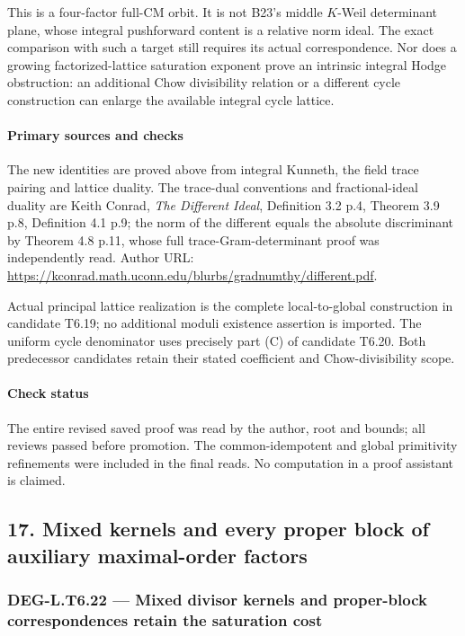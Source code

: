 This is a four-factor full-CM orbit. It is not B23's middle \(K\)-Weil determinant plane, whose integral pushforward content is a relative norm ideal. The exact comparison with such a target still requires its actual correspondence. Nor does a growing factorized-lattice saturation exponent prove an intrinsic integral Hodge obstruction: an additional Chow divisibility relation or a different cycle construction can enlarge the available integral cycle lattice.

\paragraph{Primary sources and checks}\label{primary-sources-and-checks}

The new identities are proved above from integral Kunneth, the field trace pairing and lattice duality. The trace-dual conventions and fractional-ideal duality are Keith Conrad, \emph{The Different Ideal}, Definition 3.2 p.4, Theorem 3.9 p.8, Definition 4.1 p.9; the norm of the different equals the absolute discriminant by Theorem 4.8 p.11, whose full trace-Gram-determinant proof was independently read. Author URL: \url{https://kconrad.math.uconn.edu/blurbs/gradnumthy/different.pdf}.

Actual principal lattice realization is the complete local-to-global construction in candidate T6.19; no additional moduli existence assertion is imported. The uniform cycle denominator uses precisely part (C) of candidate T6.20. Both predecessor candidates retain their stated coefficient and Chow-divisibility scope.

\paragraph{Check status}\label{check-status-2}

The entire revised saved proof was read by the author, root and bounds; all reviews passed before promotion. The common-idempotent and global primitivity refinements were included in the final reads. No computation in a proof assistant is claimed.

\subsection{17. Mixed kernels and every proper block of auxiliary maximal-order factors}\label{mixed-kernels-and-every-proper-block-of-auxiliary-maximal-order-factors}

\subsubsection{DEG-L.T6.22 --- Mixed divisor kernels and proper-block correspondences retain the saturation cost}\label{DEG-L.T6.22}

